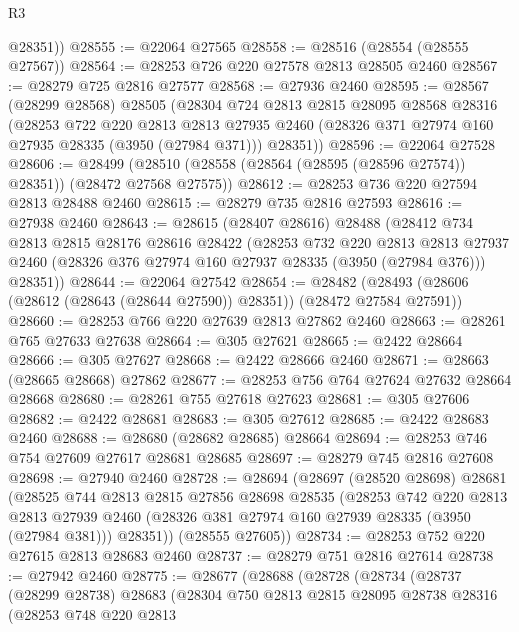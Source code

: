 \begin{lexlean}{R3}
\begin{coremodule}
        @28351))
@28555 := @22064 @27565
@28558 := @28516 (@28554 (@28555 @27567))
@28564 := @28253 @726 @220 @27578 @2813 @28505 @2460
@28567 := @28279 @725 @2816 @27577
@28568 := @27936 @2460
@28595 := @28567
    (@28299 @28568)
    @28505
    (@28304
      @724
      @2813
      @2815
      @28095
      @28568
      @28316
      (@28253
        @722
        @220
        @2813
        @2813
        @27935
        @2460
        (@28326 @371 @27974 @160 @27935 @28335 (@3950 (@27984 @371)))
        @28351))
@28596 := @22064 @27528
@28606 := @28499 (@28510 (@28558 (@28564 (@28595 (@28596 @27574)) @28351)) (@28472 @27568 @27575))
@28612 := @28253 @736 @220 @27594 @2813 @28488 @2460
@28615 := @28279 @735 @2816 @27593
@28616 := @27938 @2460
@28643 := @28615
    (@28407 @28616)
    @28488
    (@28412
      @734
      @2813
      @2815
      @28176
      @28616
      @28422
      (@28253
        @732
        @220
        @2813
        @2813
        @27937
        @2460
        (@28326 @376 @27974 @160 @27937 @28335 (@3950 (@27984 @376)))
        @28351))
@28644 := @22064 @27542
@28654 := @28482 (@28493 (@28606 (@28612 (@28643 (@28644 @27590)) @28351)) (@28472 @27584 @27591))
@28660 := @28253 @766 @220 @27639 @2813 @27862 @2460
@28663 := @28261 @765 @27633 @27638
@28664 := @305 @27621
@28665 := @2422 @28664
@28666 := @305 @27627
@28668 := @2422 @28666 @2460
@28671 := @28663 (@28665 @28668) @27862
@28677 := @28253 @756 @764 @27624 @27632 @28664 @28668
@28680 := @28261 @755 @27618 @27623
@28681 := @305 @27606
@28682 := @2422 @28681
@28683 := @305 @27612
@28685 := @2422 @28683 @2460
@28688 := @28680 (@28682 @28685) @28664
@28694 := @28253 @746 @754 @27609 @27617 @28681 @28685
@28697 := @28279 @745 @2816 @27608
@28698 := @27940 @2460
@28728 := @28694
    (@28697
      (@28520 @28698)
      @28681
      (@28525
        @744
        @2813
        @2815
        @27856
        @28698
        @28535
        (@28253
          @742
          @220
          @2813
          @2813
          @27939
          @2460
          (@28326 @381 @27974 @160 @27939 @28335 (@3950 (@27984 @381)))
          @28351))
      (@28555 @27605))
@28734 := @28253 @752 @220 @27615 @2813 @28683 @2460
@28737 := @28279 @751 @2816 @27614
@28738 := @27942 @2460
@28775 := @28677
    (@28688
      (@28728
        (@28734
          (@28737
            (@28299 @28738)
            @28683
            (@28304
              @750
              @2813
              @2815
              @28095
              @28738
              @28316
              (@28253
                @748
                @220
                @2813

\end{coremodule}
\end{lexlean}

